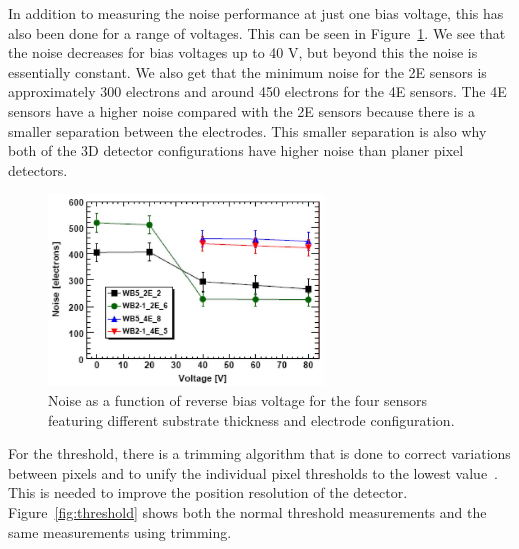 In addition to measuring the noise performance at just one bias voltage, this has also been done for a range of voltages.  This can be seen in Figure~\ref{fig:bias}. We see that the noise decreases for bias voltages up to 40 V, but beyond this the noise is essentially constant. We also get that the minimum noise for the 2E sensors is approximately 300 electrons and around 450 electrons for the 4E sensors. The 4E sensors have a higher noise compared with the 2E sensors because there is a smaller separation between the electrodes.  This smaller separation is also why both of the 3D detector configurations have higher noise than planer pixel detectors.



\begin{figure}[htb!]
\begin{center}
\centerline{
\includegraphics[width=0.65\textwidth]{3D/bias.pdf}
}
\caption{Noise as a function of reverse bias voltage for the four sensors featuring different substrate thickness and electrode configuration.~\cite{5734879} }
\label{fig:bias}
\end{center}
\end{figure}

For the threshold, there is a trimming algorithm that is done to correct variations between pixels and to unify the individual pixel thresholds to the lowest value~\cite{5734879}.  This is needed to improve the position resolution of the detector. Figure~\ref{fig:threshold} shows both the normal threshold measurements and the same measurements using trimming.


